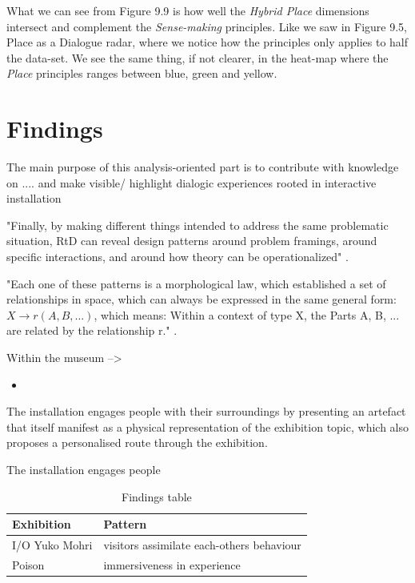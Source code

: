 What we can see from Figure 9.9 is how well the \textit{Hybrid Place} dimensions intersect and complement the \textit{Sense-making} principles. Like we saw in Figure 9.5, Place as a Dialogue radar, where we notice how the principles only applies to half the data-set. We see the same thing, if not clearer, in the heat-map where the \textit{Place} principles ranges between blue, green and yellow. 

\section{Findings}

The main purpose of this analysis-oriented part is to contribute with knowledge on .... and make visible/ highlight dialogic experiences rooted in interactive installation

"Finally, by making different things intended to address the same problematic situation, RtD can reveal design patterns \autocite{Alexander_book} around problem framings, around specific interactions, and around how theory can be operationalized" \autocite[p. 178]{zimmerman_research_2014}.


"Each one of these patterns is a morphological law, which established a set of relationships in space, which can always be expressed in the same general form: $X \rightarrow r (A, B, ...)$, which means: Within a context of type X, the Parts A, B, ... are related by the relationship r." \autocite[p. 90]{Alexander_book}.


Within the museum -->





\begin{itemize}
    \item 
\end{itemize}

The installation engages people with their surroundings by presenting an artefact that itself manifest as a physical representation of the exhibition topic, which also proposes a personalised route through the exhibition. 

 The installation engages people



\begin{table}[h]
\centering
\begin{tabular}{l | l}
\textbf{Exhibition} & \textbf{Pattern}\\
\hline
I/O Yuko Mohri & visitors assimilate each-others behaviour \\
Poison & immersiveness in experience \\
\end{tabular}
\caption{Findings table}
\label{tab:abc}
\end{table}
